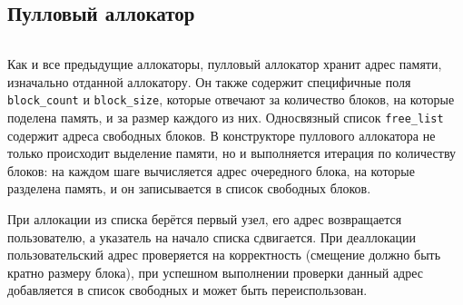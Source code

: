 \subsection{Пулловый аллокатор}
\inputminted{cpp}{pool_allocator.h}

Как и все предыдущие аллокаторы, пулловый аллокатор хранит адрес памяти, изначально отданной аллокатору. Он также содержит специфичные поля \texttt{block_count} и \texttt{block_size}, которые отвечают за количество блоков, на которые поделена память, и за размер каждого из них. Односвязный список \texttt{free_list} содержит адреса свободных блоков. В конструкторе пуллового аллокатора не только происходит выделение памяти, но и выполняется итерация по количеству блоков: на каждом шаге вычисляется адрес очередного блока, на которые разделена память, и он записывается в список свободных блоков.

При аллокации из списка берётся первый узел, его адрес возвращается пользователю, а указатель на начало списка сдвигается. При деаллокации пользовательский адрес проверяется на корректность (смещение должно быть кратно размеру блока), при успешном выполнении проверки данный адрес добавляется в список свободных и может быть переиспользован.
